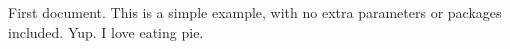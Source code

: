 \documentclass{article}
\begin{document}
First document. This is a simple example, with no 
extra parameters or packages included. Yup. I love eating pie.
\end{document}
